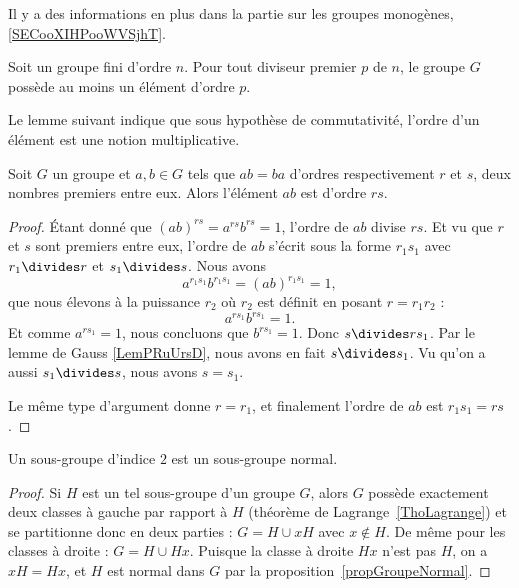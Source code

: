 Il y a des informations en plus dans la partie sur les groupes monogènes, \ref{SECooXIHPooWVSjhT}.

\begin{theorem}    \label{THOooSUWKooICbzqM}
    Soit un groupe fini d'ordre \( n\). Pour tout diviseur premier \( p\) de \( n\), le groupe \( G\) possède au moins un élément d'ordre \( p\).
\end{theorem}

Le lemme suivant indique que sous hypothèse de commutativité, l'ordre d'un élément est une notion multiplicative.
\begin{lemma}    \label{LemyETtdy}
    Soit \( G\) un groupe et \( a,b\in G\) tels que \( ab=ba\) d'ordres respectivement \( r\) et \( s\), deux nombres premiers entre eux. Alors l'élément \( ab\) est d'ordre \( rs\).
\end{lemma}

\begin{proof}
    Étant donné que \( (ab)^{rs}=a^{rs}b^{rs}=1\), l'ordre de \( ab\) divise \( rs\). Et vu que \( r\) et \( s\) sont premiers entre eux, l'ordre de \( ab\) s'écrit sous la forme \( r_1s_1\) avec \( r_1\divides r\) et \( s_1\divides s\). Nous avons
    \begin{equation}
        a^{r_1s_1}b^{r_1s_1}=(ab)^{r_1s_1}=1,
    \end{equation}
    que nous élevons à la puissance \( r_2\) où \( r_2\) est définit en posant \(r=r_1r_2\) :
    \begin{equation}
        a^{rs_1}b^{rs_1}=1.
    \end{equation}
    Et comme \( a^{rs_1}=1\), nous concluons que \( b^{rs_1}=1\). Donc \( s\divides rs_1\). Par le lemme de Gauss \ref{LemPRuUrsD}, nous avons en fait \( s\divides s_1\). Vu qu'on a aussi \( s_1\divides s\), nous avons \( s=s_1\).

    Le même type d'argument donne \( r=r_1\), et finalement l'ordre de \( ab\) est \( r_1s_1=rs\).
\end{proof}

\begin{lemma}    \label{LemSkIOOG}
    Un sous-groupe d'indice \( 2\) est un sous-groupe normal.
\end{lemma}

\begin{proof}
    Si $H$ est un tel sous-groupe d'un groupe $G$, alors $G$ possède exactement deux classes à gauche par rapport à \( H\) (théorème de Lagrange~\ref{ThoLagrange}) et se partitionne donc en deux parties : \( G=H\cup xH\) avec \( x \notin H \). De même pour les classes à droite : \( G=H\cup Hx\). Puisque la classe à droite \( Hx \) n'est pas $H$, on a \( xH = Hx \), et $H$ est normal dans $G$ par la proposition~\ref{propGroupeNormal}.
\end{proof}


